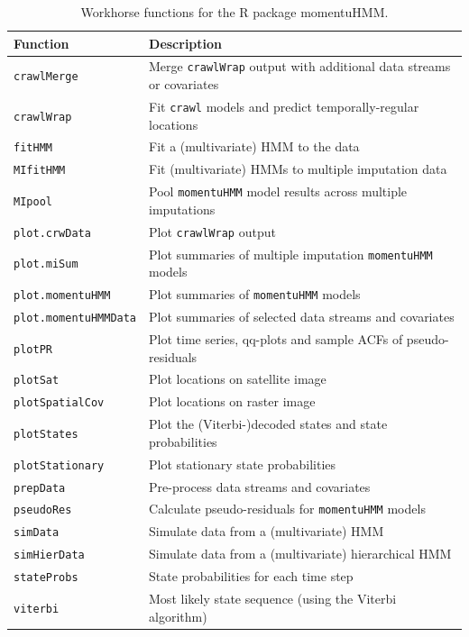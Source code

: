 \documentclass[12pt]{article}\usepackage[]{graphicx}\usepackage[]{xcolor}
\begin{document}
\begin{table}
  \caption{\label{tab:functions} Workhorse functions for the R package momentuHMM.}
  \begin{tabular}{ll}
  \toprule
  Function & Description \tabularnewline
  \midrule
  \verb|crawlMerge| & Merge \verb|crawlWrap| output with additional data streams or covariates  \tabularnewline 
  \verb|crawlWrap| & Fit \verb|crawl| models and predict temporally-regular locations  \tabularnewline  
  \verb|fitHMM| & Fit a (multivariate) HMM to the data  \tabularnewline  
  \verb|MIfitHMM| & Fit (multivariate) HMMs to multiple imputation data  \tabularnewline  
  \verb|MIpool| & Pool \verb|momentuHMM| model results across multiple imputations  \tabularnewline 
  \verb|plot.crwData| & Plot \verb|crawlWrap| output \tabularnewline 
  \verb|plot.miSum| & Plot summaries of multiple imputation \verb|momentuHMM| models  \tabularnewline 
  \verb|plot.momentuHMM| & Plot summaries of \verb|momentuHMM| models  \tabularnewline 
  \verb|plot.momentuHMMData| & Plot summaries of selected data streams and covariates  \tabularnewline 
  \verb|plotPR| & Plot time series, qq-plots and sample ACFs of pseudo-residuals \tabularnewline 
  \verb|plotSat| & Plot locations on satellite image \tabularnewline   
  \verb|plotSpatialCov| & Plot locations on raster image \tabularnewline   
  \verb|plotStates| & Plot the (Viterbi-)decoded states and state probabilities \tabularnewline 
  \verb|plotStationary| & Plot stationary state probabilities \tabularnewline
  \verb|prepData| & Pre-process data streams and covariates \tabularnewline 
  \verb|pseudoRes| & Calculate pseudo-residuals for \verb|momentuHMM| models \tabularnewline 
  \verb|simData| & Simulate data from a (multivariate) HMM \tabularnewline 
  \verb|simHierData| & Simulate data from a (multivariate) hierarchical HMM \tabularnewline 
  \verb|stateProbs| & State probabilities for each time step \tabularnewline 
  \verb|viterbi| & Most likely state sequence (using the Viterbi algorithm)  \tabularnewline  
  \bottomrule
  \end{tabular}
\end{table}
\end{document}
